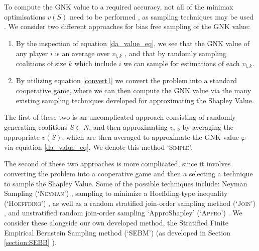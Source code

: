 \section{}\DIFaddend \label{sec:sampling_techniques}
To compute the GNK value to a required accuracy, not all of the minimax optimisations $v(S)$ need to be performed \DIFaddbegin {}\DIFaddend , as sampling techniques may be used \DIFaddbegin {}\DIFaddend .
We consider two different approaches for bias free sampling of the GNK value:
\begin{enumerate}
    \item By the inspection of equation \ref{da_value_eq}, we see that the GNK value of any player $i$ is an average over $v_{i,k}$%
, and that by randomly sampling coalitions of size $k$ which include $i$ we can sample for estimations of each $v_{i,k}$.
    \item By utilizing equation \ref{convert1} we convert the problem into a standard cooperative game, where we can then compute the GNK value via the many existing sampling techniques developed for approximating the Shapley Value.
\end{enumerate}

The first of these two is an uncomplicated approach consisting of randomly generating coalitions $S\subset N$, %
and then approximating $v_{i,k}$ by averaging the appropriate $v(S)$, which are then averaged to approximate the GNK value $\varphi$ via equation \ref{da_value_eq}. We denote this method `\textsc{Simple}'.

The second of these two approaches is more complicated, since it involves converting the problem into a cooperative game and then a selecting a technique to sample the Shapley Value.
Some of the possible techniques include: Neyman Sampling (`\textsc{Neyman}') \citep{CASTRO2017180,1938.10503378}, sampling to minimize a Hoeffding-type inequality (`\textsc{Hoeffding}') \citep{2013arXiv1306.4265M}, as well as a random stratified join-order sampling method (`\textsc{Join}') \citep{CASTRO2017180}, and unstratified random join-order sampling `ApproShapley' (`\textsc{Appro}') \citep{DBLP:journals/cor/CastroGT09}.
We consider these alongside our own developed method, the Stratified Finite Empirical Bernstein Sampling method (`SEBM') (as developed in Section \ref{section:SEBB} \DIFaddbegin {}\DIFaddend ).

